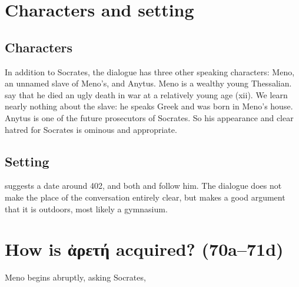 \documentclass[12pt,letterpaper]{article}
\begin{document}

\pagestyle{notes}
\section*{Characters and setting}

\subsection*{Characters}

In addition to Socrates, the dialogue has three other speaking characters: Meno, an unnamed slave of Meno's, and Anytus. Meno is a wealthy young Thessalian. \textcite{sedleylong2010} say that he died an ugly death in war at a relatively young age (xii). We learn nearly nothing about the slave: he speaks Greek and was born in Meno's house. Anytus is one of the future prosecutors of Socrates. So his appearance and clear hatred for Socrates is ominous and appropriate.


\subsection*{Setting}

\textcite[76]{morrison1942} suggests a date around 402, and both \textcite[120]{bluck1961} and \textcite[xii]{sedleylong2010} follow him. The dialogue does not make the place of the conversation entirely clear, but \textcite[120]{bluck1961} makes a good argument that it is outdoors, most likely a gymnasium.



\section*{How is \textgreek{ἀρετή} acquired? (70a--71d)}

Meno begins abruptly, asking Socrates,
\end{document}
